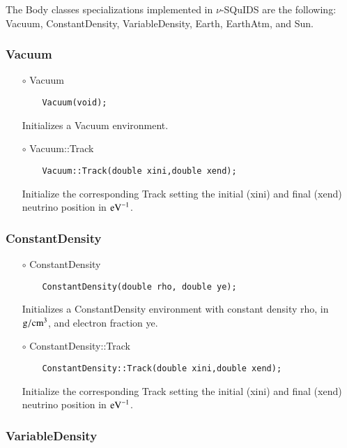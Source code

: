 The {\ttf Body} classes specializations implemented in $\nu$-SQuIDS are the following: {\ttf Vacuum}, {\ttf ConstantDensity}, {\ttf VariableDensity}, {\ttf Earth}, {\ttf EarthAtm}, and {\ttf Sun}.

\subsubsection{Vacuum}

\begin{itemize}
\item[$\circ$] {\ttf Vacuum}
  \begin{lstlisting}
    Vacuum(void);
  \end{lstlisting}
  Initializes a {\ttf Vacuum} environment. 
\item[$\circ$] {\ttf Vacuum::Track}
  \begin{lstlisting}
    Vacuum::Track(double xini,double xend);
  \end{lstlisting}
  Initialize the corresponding {\ttf Track} setting the initial ({\ttf xini}) and final ({\ttf xend}) neutrino position in ${\rm eV}^{-1}$.
\end{itemize}

\subsubsection{ConstantDensity}

\begin{itemize}
\item[$\circ$] {\ttf ConstantDensity}
  \begin{lstlisting}
    ConstantDensity(double rho, double ye);
  \end{lstlisting}
  Initializes a {\ttf ConstantDensity} environment with constant density {\ttf rho}, in ${\rm g}/{\rm cm}^3$, and electron fraction {\ttf ye}.
\item[$\circ$] {\ttf ConstantDensity::Track}
  \begin{lstlisting}
    ConstantDensity::Track(double xini,double xend);
  \end{lstlisting}
  Initialize the corresponding {\ttf Track} setting the initial ({\ttf xini}) and final ({\ttf xend}) neutrino position in ${\rm eV}^{-1}$.
\end{itemize}

\subsubsection{VariableDensity}

